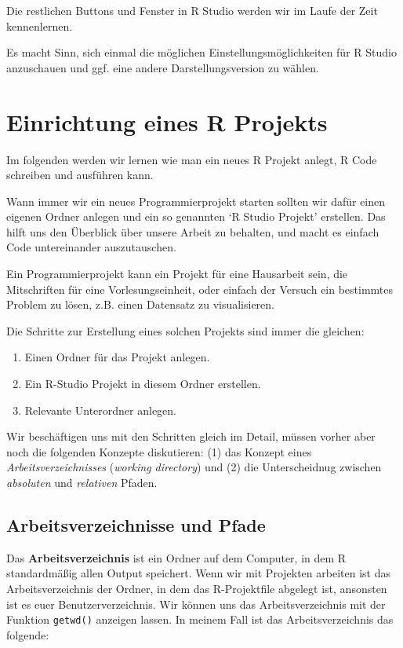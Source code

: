 \documentclass[]{book}
\providecommand{\tightlist}{%
  \setlength{\itemsep}{0pt}\setlength{\parskip}{0pt}}
\begin{document}
Die restlichen Buttons und Fenster in R Studio werden wir im Laufe der
Zeit kennenlernen.

Es macht Sinn, sich einmal die möglichen Einstellungsmöglichkeiten für R
Studio anzuschauen und ggf. eine andere Darstellungsversion zu wählen.

\section{Einrichtung eines R
Projekts}\label{einrichtung-eines-r-projekts}

Im folgenden werden wir lernen wie man ein neues R Projekt anlegt, R
Code schreiben und ausführen kann.

Wann immer wir ein neues Programmierprojekt starten sollten wir dafür
einen eigenen Ordner anlegen und ein so genannten `R Studio Projekt'
erstellen. Das hilft uns den Überblick über unsere Arbeit zu behalten,
und macht es einfach Code untereinander auszutauschen.

Ein Programmierprojekt kann ein Projekt für eine Hausarbeit sein, die
Mitschriften für eine Vorlesungseinheit, oder einfach der Versuch ein
bestimmtes Problem zu lösen, z.B. einen Datensatz zu visualisieren.

Die Schritte zur Erstellung eines solchen Projekts sind immer die
gleichen:

\begin{enumerate}
\def\labelenumi{\arabic{enumi}.}
\tightlist
\item
  Einen Ordner für das Projekt anlegen.
\item
  Ein R-Studio Projekt in diesem Ordner erstellen.
\item
  Relevante Unterordner anlegen.
\end{enumerate}

Wir beschäftigen uns mit den Schritten gleich im Detail, müssen vorher
aber noch die folgenden Konzepte diskutieren: (1) das Konzept eines
\emph{Arbeitsverzeichnisses} (\emph{working directory}) und (2) die
Unterscheidnug zwischen \emph{absoluten} und \emph{relativen} Pfaden.

\subsection{Arbeitsverzeichnisse und
Pfade}\label{arbeitsverzeichnisse-und-pfade}

Das \textbf{Arbeitsverzeichnis} ist ein Ordner auf dem Computer, in dem
R standardmäßig allen Output speichert. Wenn wir mit Projekten arbeiten
ist das Arbeitsverzeichnis der Ordner, in dem das R-Projektfile abgelegt
ist, ansonsten ist es euer Benutzerverzeichnis. Wir können uns das
Arbeitsverzeichnis mit der Funktion \texttt{getwd()} anzeigen lassen. In
meinem Fall ist das Arbeitsverzeichnis das folgende:
\end{document}

